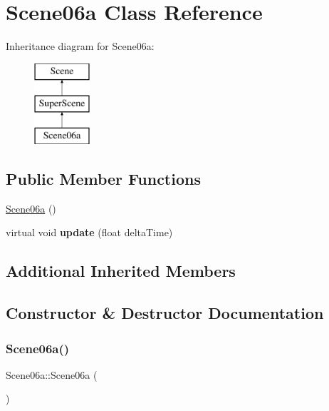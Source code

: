 \hypertarget{class_scene06a}{}\section{Scene06a Class Reference}
\label{class_scene06a}
Inheritance diagram for Scene06a\+:\begin{figure}[H]
\begin{center}
\leavevmode
\includegraphics[height=3.000000cm]{class_scene06a}
\end{center}
\end{figure}
\subsection*{Public Member Functions}
\begin{DoxyCompactItemize}
\item 
\hyperlink{class_scene06a_aae1a94fddd7955e64c2cc8a1b670437d}{Scene06a} ()
\item 
\mbox{\label{class_scene06a_ab7540d27c16b53f6a4aee09d12036ef4}} 
virtual void {\bfseries update} (float delta\+Time)
\end{DoxyCompactItemize}
\subsection*{Additional Inherited Members}


\subsection{Constructor \& Destructor Documentation}
\mbox{\label{class_scene06a_aae1a94fddd7955e64c2cc8a1b670437d}} 
\subsubsection{\texorpdfstring{Scene06a()}{Scene06a()}}
{\footnotesize\ttfamily Scene06a\+::\+Scene06a (\begin{DoxyParamCaption}{ }\end{DoxyParamCaption})}

